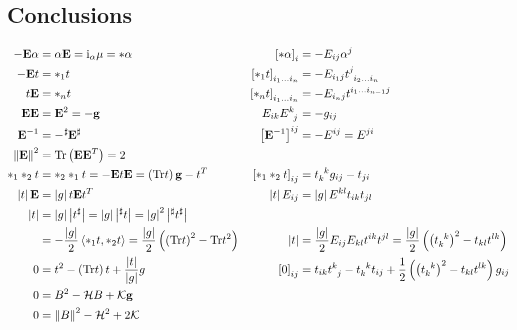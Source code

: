 \documentclass[a4paper,10pt]{scrartcl}
\newcommand{\gauss}{\mathcal{K}}
\newcommand{\mean}{\mathcal{H}}
\newcommand{\iup}{\mathrm{i}}
\newcommand{\Tr}{\mathrm{Tr}}
\newcommand{\gb}{\mathbf{g}}
\newcommand{\Eb}{\mathbf{E}}
\begin{document}
\subsection{Conclusions}
  \begin{align*}
    -\Eb\alpha &= \alpha\Eb = \iup_{\alpha}\mu = *\alpha
            &\left[ *\alpha \right]_{i} &= -E_{ij}\alpha^{j}\\
     -\Eb t &= *_{1}t 
            &\left[ *_{1}t \right]_{i_{1}\ldots i_{n}} &= -E_{i_{1}j}\tensor{t}{^{j}_{i_{2}\ldots i_{n}}} \\
      t\Eb &= *_{n}t
            &\left[ *_{n}t \right]_{i_{1}\ldots i_{n}} &= -E_{i_{n}j}\tensor{t}{^{i_{1}\ldots i_{n-1}}^{j}} \\
      \Eb\Eb &= \Eb^{2} = -\gb
            &E_{ik}\tensor{E}{^{k}_{j}} &= -g_{ij} \\
      \Eb^{-1} &= -\tensor[^{\sharp}]{\Eb}{^{\sharp}}
            &\left[ \Eb^{-1} \right]^{ij} &= -E^{ij} = E^{ji}\\
      \left\| \Eb \right\|^{2} &= \Tr\left( \Eb\Eb^{T} \right) = 2 \\
      *_{1}*_{2}t &= *_{2}*_{1}t = -\Eb t \Eb = \left( \Tr t \right)\gb - t^{T}
                &\left[ *_{1}*_{2}t \right]_{ij} &= \tensor{t}{_{k}^{k}}g_{ij} - t_{ji} \\
      \left| t \right|\Eb &= \left| g \right|t\Eb t^{T}
                &\left| t \right|E_{ij} &= \left| g \right|E^{kl}t_{ik}t_{jl} \\
      \left| t \right| &=\left| g \right|\left| t^{\sharp} \right| = \left| g \right|\left| ^{\sharp}t \right| = \left| g \right|^{2}\left| ^{\sharp}t^{\sharp} \right|\\
        &= -\frac{\left| g \right|}{2}\left\langle *_{1}t , *_{2}t \right\rangle = \frac{\left| g \right|}{2}\left( \left( \Tr t \right)^{2} - \Tr t^{2} \right)
                &\left| t \right| &= \frac{\left| g \right|}{2} E_{ij}E_{kl}t^{ik}t^{jl} = \frac{\left| g \right|}{2}\left( \left( \tensor{t}{_{k}^{k}} \right)^{2} - t_{kl}t^{lk} \right)\\
      0 &= t^{2} - \left( \Tr t \right) t + \frac{\left| t \right|}{\left| g \right|} g
            &\left[ 0 \right]_{ij} &= t_{ik}\tensor{t}{^{k}_{j}} -  \tensor{t}{_{k}^{k}}t_{ij} + \frac{1}{2}\left( \left( \tensor{t}{_{k}^{k}} \right)^{2} - t_{kl}t^{lk} \right)g_{ij}\\
      0 &= B^{2} -\mean B + \gauss \gb\\
      0 &= \left\| B \right\|^{2} - \mean^{2} + 2\gauss 
  \end{align*}
\end{document}
